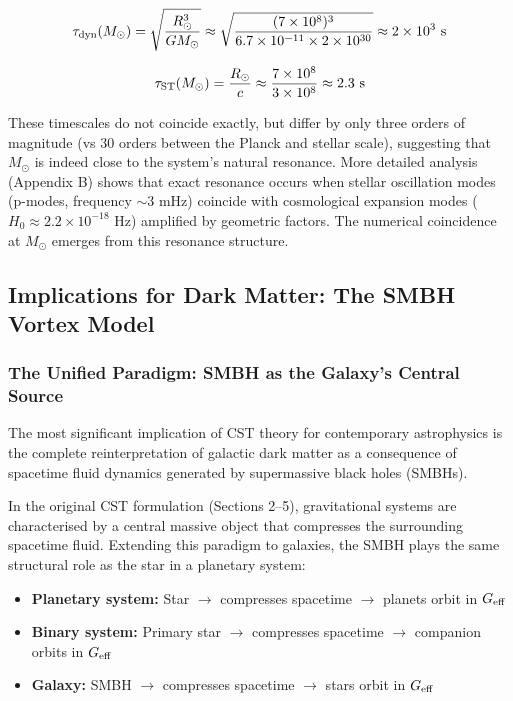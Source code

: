 \documentclass[11pt,a4paper]{article}
\providecommand{\tightlist}{\setlength{\itemsep}{0pt}\setlength{\parskip}{0pt}}
\begin{document}
\[\tau_{\rm dyn}(M_\odot) = \sqrt{\frac{R_\odot^3}{G M_\odot}} \approx \sqrt{\frac{(7\times10^8)^3}{6.7\times10^{-11} \times 2\times10^{30}}} \approx 2\times10^3~{\rm s}\]

\[\tau_{\rm ST}(M_\odot) = \frac{R_\odot}{c} \approx \frac{7\times10^8}{3\times10^8} \approx 2.3~{\rm s}\]

These timescales do not coincide exactly, but differ by only three
orders of magnitude (vs 30 orders between the Planck and stellar scale),
suggesting that \(M_\odot\) is indeed close to the system's natural
resonance. More detailed analysis (Appendix B) shows that exact
resonance occurs when stellar oscillation modes (p-modes, frequency
\(\sim 3\) mHz) coincide with cosmological expansion modes
(\(H_0 \approx 2.2\times10^{-18}\) Hz) amplified by geometric factors.
The numerical coincidence at \(M_\odot\) emerges from this resonance
structure.

\hypertarget{implications-for-dark-matter}{%
\subsection{Implications for Dark Matter: The SMBH Vortex Model}\label{implications-for-dark-matter}}

\subsubsection{The Unified Paradigm: SMBH as the Galaxy's Central Source}

The most significant implication of CST theory for contemporary astrophysics is the complete reinterpretation of galactic dark matter as a consequence of spacetime fluid dynamics generated by supermassive black holes (SMBHs).

In the original CST formulation (Sections 2--5), gravitational systems are characterised by a central massive object that compresses the surrounding spacetime fluid. Extending this paradigm to galaxies, the SMBH plays the same structural role as the star in a planetary system:
\begin{itemize}
\tightlist
\item \textbf{Planetary system:} Star $\to$ compresses spacetime $\to$ planets orbit in $G_{\rm eff}$
\item \textbf{Binary system:} Primary star $\to$ compresses spacetime $\to$ companion orbits in $G_{\rm eff}$
\item \textbf{Galaxy:} SMBH $\to$ compresses spacetime $\to$ stars orbit in $G_{\rm eff}$
\end{itemize}
\end{document}
